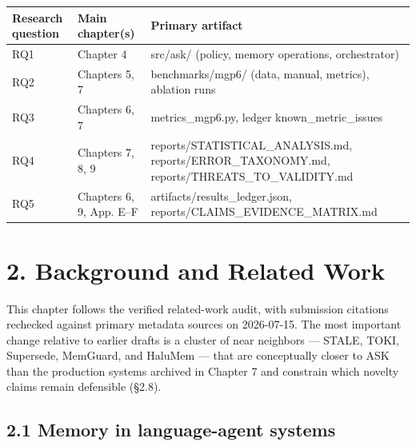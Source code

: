 {\def\LTcaptype{none} %
\begin{longtable}[]{@{}
  >{\raggedright\arraybackslash}p{}
  >{\centering\arraybackslash}p{}
  >{\raggedright\arraybackslash}p{}@{}}
\toprule\noalign{}
\begin{minipage}[b]{\linewidth}\raggedright
\textbf{Research question}
\end{minipage} & \begin{minipage}[b]{\linewidth}\centering
\textbf{Main chapter(s)}
\end{minipage} & \begin{minipage}[b]{\linewidth}\centering
\textbf{Primary artifact}
\end{minipage} \\
\midrule\noalign{}
\endhead
\bottomrule\noalign{}
\endlastfoot
RQ1 & Chapter 4 & src/ask/ (policy, memory operations, orchestrator) \\
RQ2 & Chapters 5, 7 & benchmarks/mgp6/ (data, manual, metrics), ablation
runs \\
RQ3 & Chapters 6, 7 & metrics\_mgp6.py, ledger known\_metric\_issues \\
RQ4 & Chapters 7, 8, 9 & reports/STATISTICAL\_ANALYSIS.md,
reports/ERROR\_TAXONOMY.md, reports/THREATS\_TO\_VALIDITY.md \\
RQ5 & Chapters 6, 9, App. E--F & artifacts/results\_ledger.json,
reports/CLAIMS\_EVIDENCE\_MATRIX.md \\
\end{longtable}
}

\section{2. Background and Related
Work}\label{background-and-related-work}

This chapter follows the verified related-work audit, with submission
citations rechecked against primary metadata sources on 2026-07-15. The
most important change relative to earlier drafts is a cluster of near
neighbors --- STALE, TOKI, Supersede, MemGuard, and HaluMem --- that are
conceptually closer to ASK than the production systems archived in
Chapter 7 and constrain which novelty claims remain defensible (§2.8).

\subsection{2.1 Memory in language-agent
systems}\label{memory-in-language-agent-systems}

